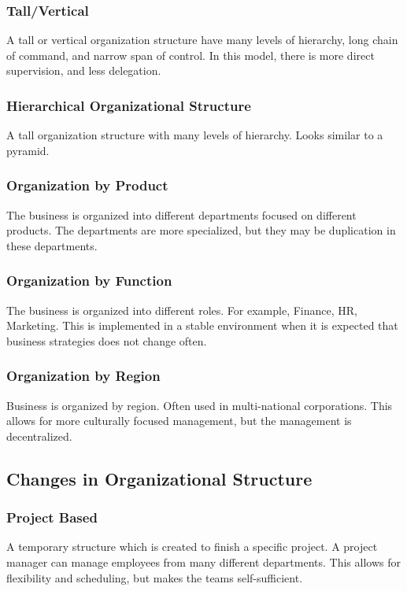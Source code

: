 \documentclass{standalone}
\begin{document}
\subsubsection{Tall/Vertical}
A tall or vertical organization structure have many levels of hierarchy, long chain of command, and narrow span of control.
In this model, there is more direct supervision, and less delegation.

\subsubsection{Hierarchical Organizational Structure}
A tall organization structure with many levels of hierarchy.
Looks similar to a pyramid.

\subsubsection{Organization by Product}
The business is organized into different departments focused on different products.
The departments are more specialized, but they may be duplication in these departments.

\subsubsection{Organization by Function}
The business is organized into different roles. 
For example, Finance, HR, Marketing.
This is implemented in a stable environment when it is expected that business strategies does not change often.

\subsubsection{Organization by Region}
Business is organized by region.
Often used in multi-national corporations.
This allows for more culturally focused management, but the management is decentralized.

\subsection{Changes in Organizational Structure}
\subsubsection{Project Based}
A temporary structure which is created to finish a specific project.
A project manager can manage employees from many different departments.
This allows for flexibility and scheduling, but makes the teams self-sufficient.
\end{document}
